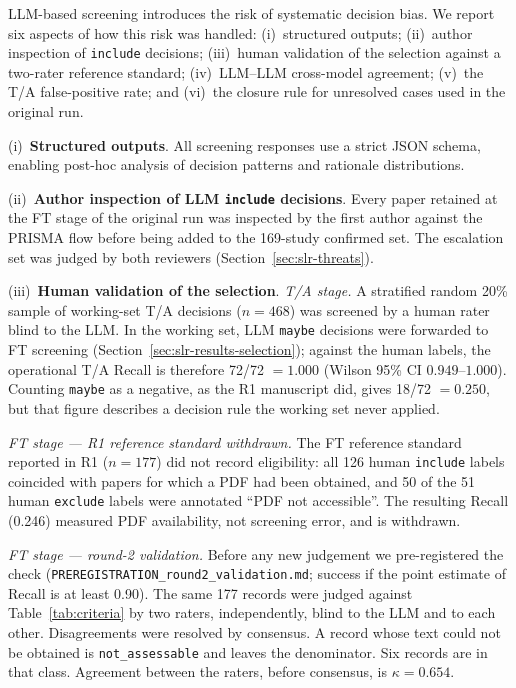 LLM-based screening introduces the risk of systematic decision bias. We
report six aspects of how this risk was handled: (i)~structured outputs;
(ii)~author inspection of \texttt{include} decisions; (iii)~human
validation of the selection against a two-rater reference standard;
(iv)~LLM--LLM cross-model agreement; (v)~the T/A false-positive rate; and
(vi)~the closure rule for unresolved cases used in the original run.

(i)~\textbf{Structured outputs}. All screening responses use a strict JSON
schema, enabling post-hoc analysis of decision patterns and rationale
distributions.

(ii)~\textbf{Author inspection of LLM \texttt{include} decisions}.
Every paper retained at the FT stage of the original run was inspected by the
first author against the PRISMA flow before being added to the 169-study
confirmed set. The escalation set was judged by both reviewers
(Section~\ref{sec:slr-threats}).

(iii)~\textbf{Human validation of the selection}.
\emph{T/A stage.} A stratified random 20\% sample of working-set T/A
decisions ($n=468$) was screened by a human rater blind to the LLM. In the
working set, LLM \texttt{maybe} decisions were forwarded to FT screening
(Section~\ref{sec:slr-results-selection}); against the human labels, the
operational T/A Recall is therefore 72/72 $=1.000$ (Wilson 95\% CI
$0.949$--$1.000$). Counting \texttt{maybe} as a negative, as the R1
manuscript did, gives 18/72 $=0.250$, but that figure describes a decision
rule the working set never applied.

\emph{FT stage --- R1 reference standard withdrawn.} The FT reference
standard reported in R1 ($n=177$) did not record eligibility: all 126 human
\texttt{include} labels coincided with papers for which a PDF had been
obtained, and 50 of the 51 human \texttt{exclude} labels were annotated
``PDF not accessible''. The resulting Recall (0.246) measured PDF
availability, not screening error, and is withdrawn.

\emph{FT stage --- round-2 validation.} Before any new judgement we
pre-registered the check
(\texttt{PREREGISTRATION\_round2\_validation.md}; success if the point
estimate of Recall is at least 0.90). The same 177 records were judged
against Table~\ref{tab:criteria} by two raters, independently, blind to the
LLM and to each other. Disagreements were resolved by consensus. A record
whose text could not be obtained is \texttt{not\_assessable} and leaves the
denominator. Six records are in that class. Agreement between the raters,
before consensus, is $\kappa = 0.654$.

